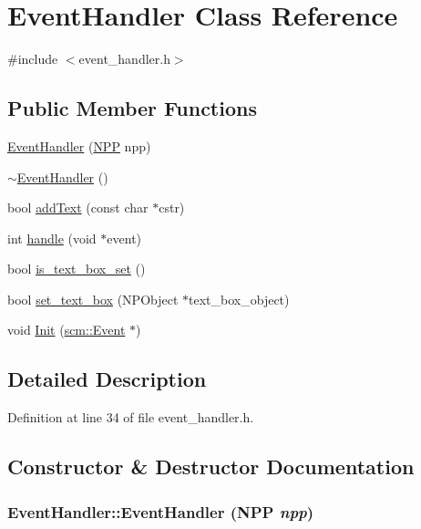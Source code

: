 \hypertarget{class_event_handler}{
\section{EventHandler Class Reference}
\label{class_event_handler}
}


{\ttfamily \#include $<$event\_\-handler.h$>$}

\subsection*{Public Member Functions}
\begin{DoxyCompactItemize}
\item 
\hyperlink{class_event_handler_a6b7f9af8b5c3c4128047d35467ca0da0}{EventHandler} (\hyperlink{struct___n_p_p}{NPP} npp)
\item 
\hyperlink{class_event_handler_a3decb8cd88ba8af2b9b0b0f0f2fcd722}{$\sim$EventHandler} ()
\item 
bool \hyperlink{class_event_handler_a18771c6be120edf9d912a4003066b8b3}{addText} (const char $\ast$cstr)
\item 
int \hyperlink{class_event_handler_a2fcafd6f528017d8a814f9c384e2e057}{handle} (void $\ast$event)
\item 
bool \hyperlink{class_event_handler_a2f334e3eb39be72751e342619489e695}{is\_\-text\_\-box\_\-set} ()
\item 
bool \hyperlink{class_event_handler_aa09c0b995aa6c774d4a33be13be0cbf2}{set\_\-text\_\-box} (NPObject $\ast$text\_\-box\_\-object)
\item 
void \hyperlink{class_event_handler_a67d149352861c0a8fe603a14585d1003}{Init} (\hyperlink{classscm_1_1_event}{scm::Event} $\ast$)
\end{DoxyCompactItemize}


\subsection{Detailed Description}


Definition at line 34 of file event\_\-handler.h.



\subsection{Constructor \& Destructor Documentation}
\hypertarget{class_event_handler_a6b7f9af8b5c3c4128047d35467ca0da0}{
\subsubsection[{EventHandler}]{\setlength{\rightskip}{0pt plus 5cm}EventHandler::EventHandler ({\bf NPP} {\em npp})}}
\label{class_event_handler_a6b7f9af8b5c3c4128047d35467ca0da0}


